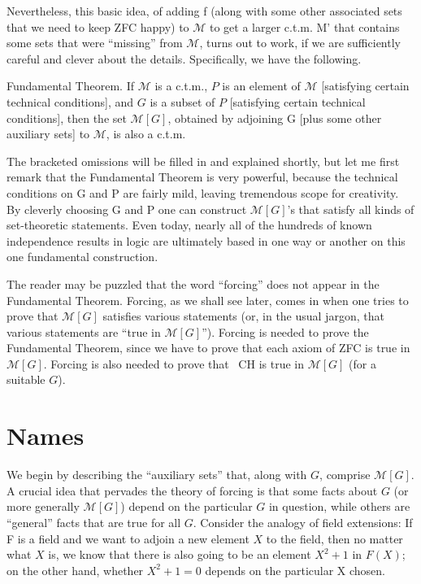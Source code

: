 \documentclass[10pt]{article}
\newcommand\axiom[1]{\textmd{#1}}
\begin{document}
Nevertheless, this basic idea, of adding f (along with some other associated sets that we need to keep \axiom{ZFC} happy) to $\mathcal{M}$ to get a larger c.t.m. M' that contains some sets that were ``missing'' from $\mathcal M$, turns out to work, if we are sufficiently careful and clever about the details. Specifically, we have the following.

Fundamental Theorem. If $\mathcal{M}$ is a c.t.m., $P$ is an element of $\mathcal{M}$ [satisfying certain technical conditions], and $G$ is a subset of $P$ [satisfying certain technical conditions], then the set $\mathcal{M}[G]$, obtained by adjoining G [plus some other auxiliary sets] to $\mathcal M$, is also a c.t.m.

The bracketed omissions will be filled in and explained shortly, but let me first remark that the Fundamental Theorem is very powerful, because the technical conditions on G and P are fairly mild, leaving tremendous scope for creativity. By cleverly choosing G and P one can construct $\mathcal{M}[G]$'s that satisfy all kinds of set-theoretic statements. Even today, nearly all of the hundreds of known independence results in logic are ultimately based in one way or another on this one fundamental construction.

The reader may be puzzled that the word ``forcing'' does not appear in the Fundamental Theorem. Forcing, as we shall see later, comes in when one tries to prove that $\mathcal{M}[G]$ satisfies various statements (or, in the usual jargon, that various statements are ``true in $\mathcal{M}[G]$''). Forcing is needed to prove the Fundamental Theorem, since we have to prove that each axiom of \axiom{ZFC} is true in $\mathcal{M}[G]$. Forcing is also needed to prove that \axiom{~CH} is true in $\mathcal{M}[G]$ (for a suitable $G$).


\section{Names}

We begin by describing the ``auxiliary sets'' that, along with $G$, comprise $\mathcal M[G]$. A crucial idea that pervades the theory of forcing is that some facts about $G$ (or more generally $\mathcal{M}[G]$) depend on the particular $G$ in question, while others are ``general'' facts that are true for all $G$. Consider the analogy of field extensions: If F is a field and we want to adjoin a new element $X$ to the field, then no matter what $X$ is, we know that there is also going to be an element $X^2 + 1$ in $F(X)$; on the other hand, whether $X^2 + 1 = 0$ depends on the particular X chosen.
\end{document}
